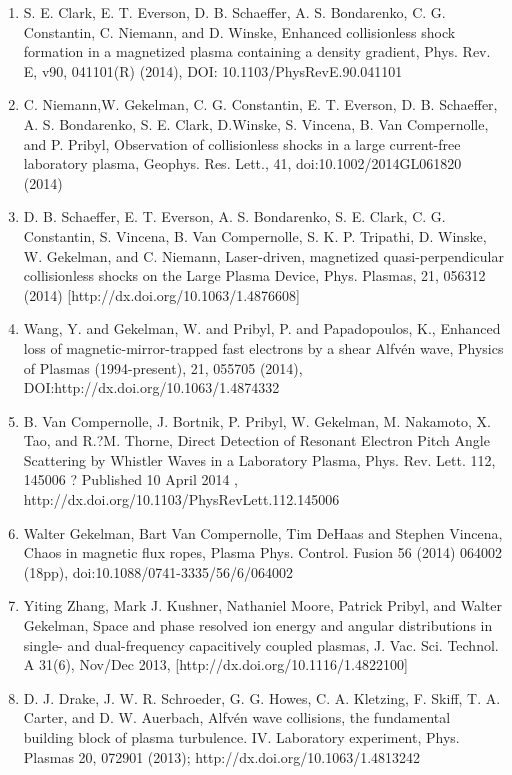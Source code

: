 \documentclass[11pt]{article}
\begin{document}
\begin{enumerate}
\item   S. E. Clark, E. T. Everson, D. B. Schaeffer, A. S. Bondarenko, C. G. Constantin, C. Niemann, and D. Winske, Enhanced collisionless shock formation in a magnetized plasma containing a density gradient, Phys. Rev. E, v90, 041101(R) (2014), DOI: 10.1103/PhysRevE.90.041101

\item    C. Niemann,W. Gekelman, C. G. Constantin, E. T. Everson, D. B. Schaeffer, A. S. Bondarenko, S. E. Clark, D.Winske, S. Vincena, B. Van Compernolle, and P. Pribyl, Observation of collisionless shocks in a large current-free laboratory plasma, Geophys. Res. Lett., 41, doi:10.1002/2014GL061820 (2014)

\item   D. B. Schaeffer, E. T. Everson, A. S. Bondarenko, S. E. Clark, C. G. Constantin, S. Vincena, B. Van Compernolle, S. K. P. Tripathi, D. Winske, W. Gekelman, and C. Niemann, Laser-driven, magnetized quasi-perpendicular collisionless shocks on the Large Plasma Device, Phys. Plasmas, 21, 056312 (2014) [http://dx.doi.org/10.1063/1.4876608]

\item  Wang, Y. and Gekelman, W. and Pribyl, P. and Papadopoulos, K., Enhanced loss of magnetic-mirror-trapped fast electrons by a shear Alfv\'{e}n wave, Physics of Plasmas (1994-present), 21, 055705 (2014), DOI:http://dx.doi.org/10.1063/1.4874332

\item   B. Van Compernolle, J. Bortnik, P. Pribyl, W. Gekelman, M. Nakamoto, X. Tao, and R.?M. Thorne, Direct Detection of Resonant Electron Pitch Angle Scattering by Whistler Waves in a Laboratory Plasma, Phys. Rev. Lett. 112, 145006 ? Published 10 April 2014 , http://dx.doi.org/10.1103/PhysRevLett.112.145006

\item  Walter Gekelman, Bart Van Compernolle, Tim DeHaas and Stephen Vincena, Chaos in magnetic flux ropes, Plasma Phys. Control. Fusion 56 (2014) 064002 (18pp), doi:10.1088/0741-3335/56/6/064002

\item   Yiting Zhang, Mark J. Kushner, Nathaniel Moore, Patrick Pribyl, and Walter Gekelman, Space and phase resolved ion energy and angular distributions in single- and dual-frequency capacitively coupled plasmas, J. Vac. Sci. Technol. A 31(6), Nov/Dec 2013, [http://dx.doi.org/10.1116/1.4822100]

\item  D. J. Drake, J. W. R. Schroeder, G. G. Howes, C. A. Kletzing, F. Skiff, T. A. Carter, and D. W. Auerbach, Alfv\'{e}n wave collisions, the fundamental building block of plasma turbulence. IV. Laboratory experiment, Phys. Plasmas 20, 072901 (2013); http://dx.doi.org/10.1063/1.4813242


\end{enumerate}
\end{document}
